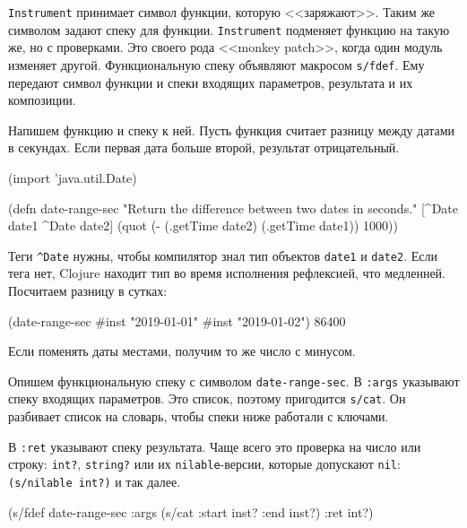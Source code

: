 
\verb|Instrument| принимает символ функции, которую <<заряжают>>. Таким же
символом задают спеку для функции. \verb|Instrument| подменяет функцию на
такую же, но с проверками. Это своего рода <<monkey
patch>>, когда один модуль
изменяет другой. Функциональную спеку объявляют макросом \verb|s/fdef|. Ему
передают символ функции и спеки входящих параметров, результата и их композиции.


Напишем функцию и спеку к ней. Пусть функция считает разницу между датами в
секундах. Если первая дата больше второй, результат отрицательный.

\begin{english}
  \begin{clojure}
(import 'java.util.Date)

(defn date-range-sec
  "Return the difference between two dates in seconds."
  [^Date date1 ^Date date2]
  (quot (- (.getTime date2)
           (.getTime date1))
        1000))
  \end{clojure}
\end{english}

Теги \verb|^Date| нужны, чтобы компилятор знал тип объектов \verb|date1| и
\verb|date2|. Если тега нет, Clojure находит тип во время исполнения
рефлексией, что медленней. Посчитаем разницу в сутках:

\begin{english}
  \begin{clojure}
(date-range-sec #inst "2019-01-01" #inst "2019-01-02")
86400
  \end{clojure}
\end{english}

\noindent
Если поменять даты местами, получим то же число с минусом.

Опишем функциональную спеку с символом \verb|date-range-sec|. В \verb|:args|
указывают спеку входящих параметров. Это список, поэтому пригодится
\verb|s/cat|. Он разбивает список на словарь, чтобы спеки ниже работали с
ключами.

В \verb|:ret| указывают спеку результата. Чаще всего это проверка на число или
строку: \verb|int?|, \verb|string?| или их \verb|nilable|-версии, которые
допускают \verb|nil|: \verb|(s/nilable int?)| и так далее.


\begin{english}
  \begin{clojure}
(s/fdef date-range-sec
  :args (s/cat :start inst? :end inst?)
  :ret int?)
  \end{clojure}
\end{english}

